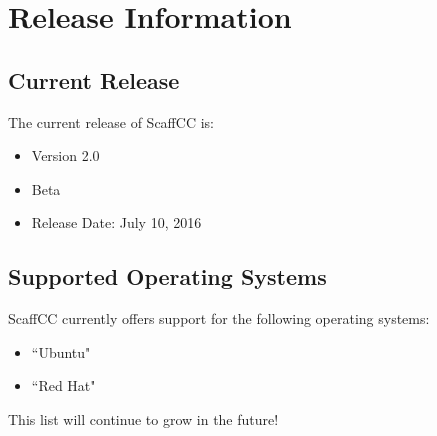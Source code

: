 \chapter{Release Information}\label{ch:release}
\section{Current Release}
    The current release of ScaffCC is:
    \begin{itemize}
        \item Version 2.0
        \item Beta
        \item Release Date: July 10, 2016
    \end{itemize}
\section{Supported Operating Systems}
    ScaffCC currently offers support for the following operating systems:
    \begin{itemize}
        \item ``Ubuntu"
        \item ``Red Hat"
    \end{itemize}
    This list will continue to grow in the future!

